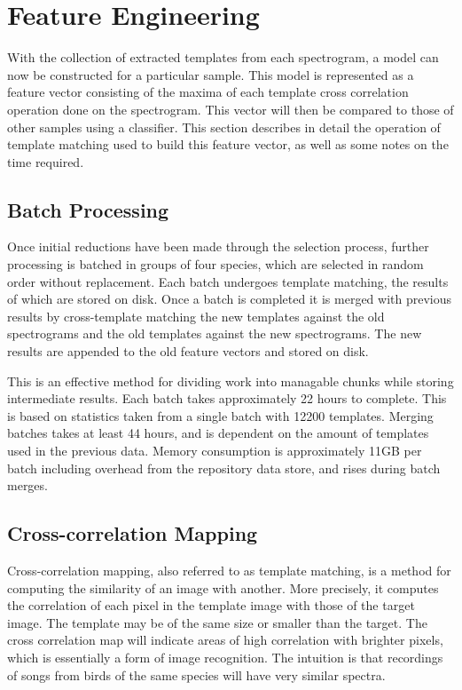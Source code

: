 \section{Feature Engineering}\label{sec:ccm}
With the collection of extracted templates from each spectrogram,
a model can now be constructed for a particular sample.
This model is represented as a feature vector consisting of the maxima
of each template cross correlation operation done on the spectrogram.
This vector will then be compared to those of other samples using a
classifier.
This section describes in detail the operation of template matching
used to build this feature vector, as well as some notes on the time required.

\subsection{Batch Processing}
Once initial reductions have been made through the selection process,
further processing is batched in groups of four species, which are selected in
random order without replacement.
Each batch undergoes template matching, the results of which are stored on disk.
Once a batch is completed it is merged with previous results by cross-template
matching the new templates against the old spectrograms and the old templates
against the new spectrograms.
The new results are appended to the old feature vectors and stored on disk.

This is an effective method for dividing work into managable chunks while storing
intermediate results.
Each batch takes approximately 22 hours to complete.
This is based on statistics taken from a single batch with 12200 templates.
Merging batches takes at least 44 hours, and is dependent on the amount of
templates used in the previous data.
Memory consumption is approximately 11GB per batch including overhead from
the repository data store, and rises during batch merges.

\subsection{Cross-correlation Mapping}
Cross-correlation mapping, also referred to as template matching, is
a method for computing the similarity of an image with another.
More precisely, it computes the correlation of each pixel in the template image
with those of the target image.
The template may be of the same size or smaller than the target.
The cross correlation map will indicate areas of high correlation with brighter
pixels, which is essentially a form of image recognition.
The intuition is that recordings of songs from birds of the same species will
have very similar spectra.

